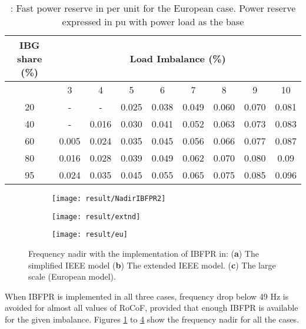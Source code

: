 \begin{table}[h]
	\caption{\label{tb:crpowr}: Fast power reserve in per unit for the European case. Power reserve expressed in pu with power load as the base}
	\centering
	\begin{tabular}{*9c}
		\toprule
		\textbf{IBG share (\%)}    & \multicolumn{8}{c}{\textbf{Load Imbalance (\%)}} \\
		\midrule
		{} & 3&    4&    5&    6&    7&    8&    9    &10 \\
		\midrule
		20&    -&    -&    0.025&    0.038&    0.049&    0.060&    0.070&    0.081\\
		40&    -&    0.016&    0.030&    0.041&    0.052&    0.063&    0.073&    0.083\\
		60&    0.005&    0.024&    0.035&    0.045&    0.056&    0.066&    0.077&    0.087\\
		80&    0.016&    0.028&    0.039&    0.049&    0.062&    0.070&    0.080&    0.09\\
		
		95&    0.024&    0.035&    0.045&    0.055&    0.065&    0.075&    0.085&    0.096\\
		\bottomrule
	\end{tabular}
\end{table}
\begin{figure}[h]
	\centering
	\begin{subfigure}[h]{0.49\textwidth}
		\centering
		\texttt{[image: result/NadirIBFPR2]}
		\caption{}
		\label{fig:res_ieee_ibfpr}
	\end{subfigure}
	\hfill
	\begin{subfigure}[h]{0.49\textwidth}
		\centering
		\texttt{[image: result/extnd]}
		\caption{}
		\label{fig:res_extd_ibfpr}
	\end{subfigure}
	\hfill
	\begin{subfigure}[h]{0.48\textwidth}
		\centering
		\texttt{[image: result/eu]}
		\caption{}
		\label{fig:res_euro_ibfpr}
	\end{subfigure}
	
	
	\caption{Frequency nadir with the implementation of IBFPR in: (\textbf{a}) The simplified IEEE model  (\textbf{b}) The extended IEEE model. (\textbf{c}) The large scale (European model). }
\end{figure}
When IBFPR is implemented in all three cases, frequency drop below 49 Hz is avoided for almost all values of RoCoF, provided that enough IBFPR is available for the given imbalance. Figures \ref{fig:res_ieee_ibfpr} to \ref{fig:res_euro_ibfpr} show the frequency nadir for all the cases.\\


